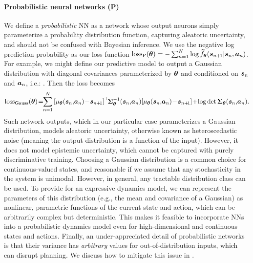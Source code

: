 \paragraph{Probabilistic neural networks (P)}
\label{sec:probabilistic}
We define a \textit{probabilistic} NN as a network whose output neurons simply parameterize a probability distribution function, capturing aleatoric uncertainty, and should not be confused with Bayesian inference. We use the negative log prediction probability as our loss function $\text{loss}_{\text{P}}(\boldsymbol{\theta}) = -\sum_{n=1}^{N} \log \widetilde{f}_{\boldsymbol{\theta}}(\boldsymbol{s}_{n+\!1} | \boldsymbol{s}_n,\boldsymbol{a}_n)$.
For example, we might define our predictive model to output a Gaussian distribution with diagonal covariances parameterized by $\boldsymbol{\theta}$ and conditioned on $\boldsymbol{s}_n$ and $\boldsymbol{a}_n$, i.e.: .
Then the loss becomes 
%
\vspace{-5pt}
\begin{align}
\text{loss}_{\text{Gauss}}(\parameters) \!=\!\! \sum_{n=1}^{N} \left[\mean_{\parameters}(\MDPState_n,\!\MDPAction_n)\!-\! \MDPState_{n+\!1}\right]^\top\!\!\varMat^{-1}_{\parameters}(\MDPState_n,\!\MDPAction_n)\!\left[\mean_{\parameters}(\MDPState_n,\!\MDPAction_n)\!-\!\MDPState_{n+\!1}\right] \!+\! \log\det{\varMat_{\parameters}(\MDPState_n,\!\MDPAction_n)}.
\end{align}
%
Such network outputs, which in our particular case parameterizes a Gaussian distribution, models aleatoric uncertainty, otherwise known as heteroscedastic noise (meaning the output distribution is a function of the input). However, it does not model epistemic uncertainty, which cannot be captured with purely discriminative training.
Choosing a Gaussian distribution is a common choice for continuous-valued states, and reasonable if we assume that any stochasticity in the system is unimodal. 
However, in general, any tractable distribution class can be used. 
To provide for an expressive dynamics model, we can represent the parameters of this distribution (e.g., the mean and covariance of a Gaussian) as nonlinear, parametric functions of the current state and action, which can be arbitrarily complex but deterministic. 
This makes it feasible to incorporate NNs into a probabilistic dynamics model even for high-dimensional and continuous states and actions.
Finally, an under-appreciated detail of probabilistic networks is that their variance has \textit{arbitrary} values for out-of-distribution inputs, which can disrupt planning.
We discuss how to mitigate this issue in .
%
    
